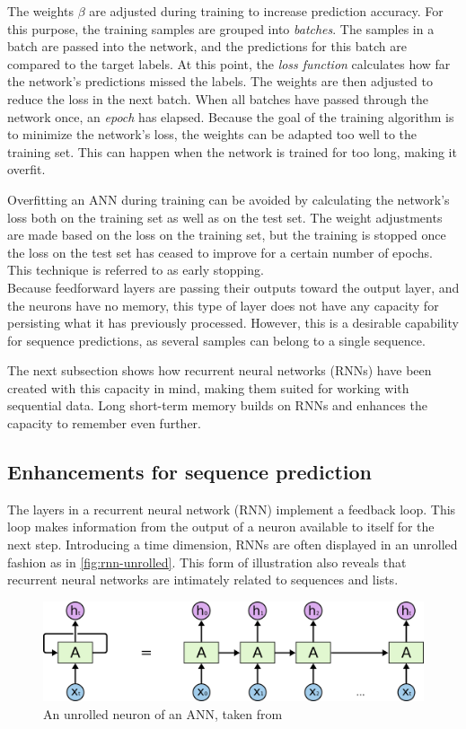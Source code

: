 The weights $\beta$ are adjusted during training to increase prediction accuracy. For this purpose, the training samples are grouped into \textit{batches}. The samples in a batch are passed into the network, and the predictions for this batch are compared to the target labels. At this point, the \textit{loss function} calculates how far the network's predictions missed the labels. The weights are then adjusted to reduce the loss in the next batch. When all batches have passed through the network once, an \textit{epoch} has elapsed. Because the goal of the training algorithm is to minimize the network's loss, the weights can be adapted too well to the training set. This can happen when the network is trained for too long, making it overfit.

Overfitting an ANN during training can be avoided by calculating the network's loss both on the training set as well as on the test set. The weight adjustments are made based on the loss on the training set, but the training is stopped once the loss on the test set has ceased to improve for a certain number of epochs. This technique is referred to as early stopping.\\

Because feedforward layers are passing their outputs toward the output layer, and the neurons have no memory, this type of layer does not have any capacity for persisting what it has previously processed. However, this is a desirable capability for sequence predictions, as several samples can belong to a single sequence.

The next subsection shows how recurrent neural networks (RNNs) have been created with this capacity in mind, making them suited for working with sequential data. Long short-term memory builds on RNNs and enhances the capacity to remember even further.

\FloatBarrier
\subsection{Enhancements for sequence prediction}\label{sec:recurrent-networks}
The layers in a recurrent neural network (RNN) implement a feedback loop. This loop makes information from the output of a neuron available to itself for the next step. Introducing a time dimension, RNNs are often displayed in an unrolled fashion as in \autoref{fig:rnn-unrolled}. This form of illustration also reveals that recurrent neural networks are intimately related to sequences and lists.

\begin{figure}[!htb]
    \centering
    \includegraphics[width=.9\textwidth]{gfx/rnn-unrolled.png}
    \caption[An unrolled neuron of an ANN]{An unrolled neuron of an ANN, taken from~\cite{web:colah}}
    \label{fig:rnn-unrolled}
\end{figure}

